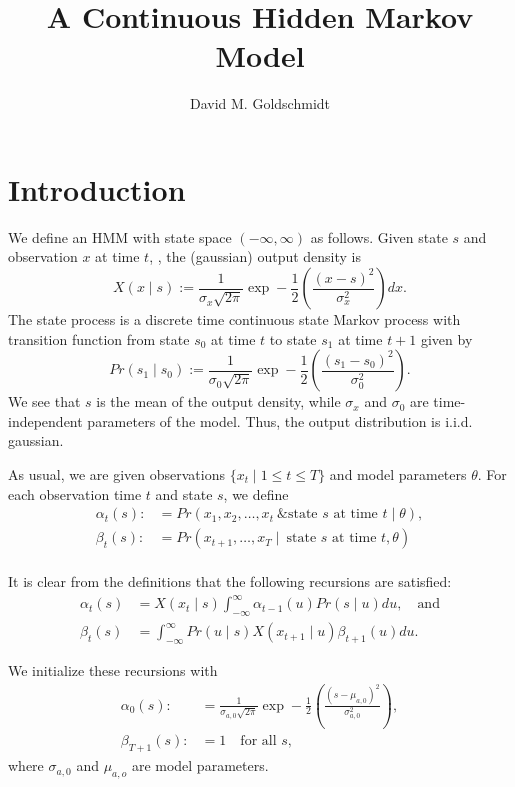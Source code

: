 \documentclass[12pt,leqno]{article}
\title{A Continuous Hidden Markov Model}
\author{David M. Goldschmidt}
\begin{document}
\newcommand{\p}{\ensuremath{u}}
\newcommand{\VV}{V}
\maketitle

\section{Introduction}
We define an HMM with state space $(-\infty,\infty)$ as follows.  Given state $s$ and observation $x$ at time
$t$, , the (gaussian) output density is
$$
X(x\mid s) := \frac{1}{\sigma_x\sqrt{2\pi}}\exp-\frac{1}{2}\left(\frac{(x-s)^2}{\sigma_x^2}\right)dx.
$$
The state process is a discrete time continuous state Markov process with transition function
from state $s_0$ at time $t$ to state $s_1$ at time $t+1$ given by
$$
Pr(s_1\mid s_0) :=  \frac{1}{\sigma_0\sqrt{2\pi}}\exp-\frac{1}{2}\left(\frac{(s_1-s_0)^2}{\sigma_0^2}\right).
$$
We see that $s$ is the mean of the output density, while $\sigma_x$ and $\sigma_0$ are time-independent
parameters of the model. Thus, the output distribution is i.i.d. gaussian.

As usual, we are given observations $\{x_t\mid 1\le t\le T\}$ and model parameters $\theta$.
For each observation time $t$ and state $s$, we define
\begin{align*}
  \alpha_t(s) :&= Pr(x_1,x_2,\dots,x_t~ \& \text{state $s$ at time $t$}\mid \theta ),\\
  \beta_t(s) :&= Pr(x_{t+1},\dots,x_T \mid ~\text{state $s$ at time $t$},\theta)\\
\end{align*}

It is clear from the definitions that the following recursions are satisfied:
\begin{align}
\alpha_t(s) &= X(x_t \mid s)\int_{-\infty}^{\infty}\alpha_{t-1}(u)Pr(s \mid u)du,\quad\text{and}\label{alpha:0}\\
\beta_t(s) &= \int_{-\infty}^{\infty}Pr(u \mid s)X(x_{t+1} \mid u)\beta_{t+1}(u)du.\label{beta:0}
\end{align}

We initialize these recursions with
\begin{align*}
\alpha_0(s) :&= \frac{1}{\sigma_{a,0}\sqrt{2\pi}}\exp-\frac{1}{2}\left(\frac{(s-\mu_{a,0})^2}{\sigma_{a,0}^2}\right),\\
\beta_{T+1}(s) :&= 1 \quad\text{for all $s$},
\end{align*}
where $\sigma_{a,0}$ and $\mu_{a,o}$ are model parameters.
\end{document}
